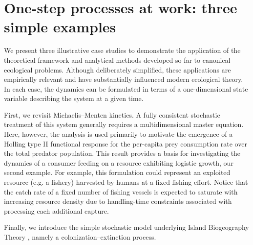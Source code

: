 
\section{One-step processes at work: three simple examples}
We present three illustrative case studies to demonstrate the application of the theoretical framework and analytical methods developed so far to canonical ecological problems. Although deliberately simplified, these applications are empirically relevant and have substantially influenced modern ecological theory. In each case, the dynamics can be formulated in terms of a one-dimensional state variable describing the system at a given time.

First, we revisit Michaelis–Menten kinetics. A fully consistent stochastic treatment of this system generally requires a multidimensional master equation. Here, however, the analysis is used primarily to motivate the emergence of a Holling type II functional response for the per-capita prey consumption rate over the total predator population. This result provides a basis for investigating the dynamics of a consumer feeding on a resource exhibiting logistic growth, our second example. For example, this formulation could represent an exploited resource (e.g. a fishery) harvested by humans at a fixed fishing effort. Notice that the catch rate of a fixed number of fishing vessels is expected to saturate with increasing resource density due to handling-time constraints associated with processing each additional capture.

Finally, we introduce the simple stochastic model underlying Island Biogeography Theory \cite{MacArthur67}, namely a colonization–extinction process.

